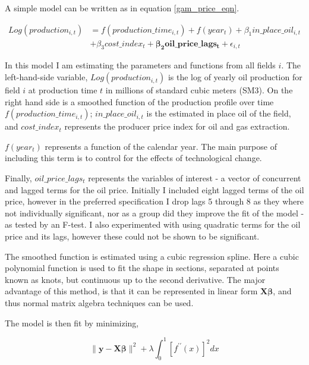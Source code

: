 \documentclass[11pt]{article}
\begin{document}
A simple model can be written as in equation \ref{gam_price_eqn}. 

\begin{equation}
\begin{split}

	Log(production_{i,t}) & = f(production\_time_{i,t}) + f(year_t) + \beta_1 in\_place\_oil_{i,t}\\
	 \quad & + \beta_3 cost\_index_{t} + \mathbf{\beta_2 oil\_price\_lags_t} +  
	  \epsilon_{i,t}
\label{gam_price_eqn}
\end{split}
\end{equation}

In this model I am estimating the parameters and functions from all fields $i$. The left-hand-side variable, $Log(production_{i,t})$ is the log of yearly oil production for field $i$ at production time $t$ in millions of standard cubic meters (SM3).  On the right hand side is a smoothed function of the production profile over time $f(production\_time_{i,t})$; $in\_place\_oil_{i,t}$ is the estimated in place oil of the field, and $cost\_index_{t}$ represents the producer price index for oil and gas extraction. 

$f(year_t)$ represents a function of the calendar year.  The main purpose of including this term is to control for the effects of technological change.

Finally, $oil\_price\_lags_t$ represents the variables of interest - a vector of concurrent and lagged terms for the oil price. Initially I included eight lagged terms of the oil price, however in the preferred specification I drop lags 5 through 8 as they where not individually significant, nor as a group did they improve the fit of the model - as tested by an F-test. I also experimented with using quadratic terms for the oil price and its lags, however these could not be shown to be significant. 

The smoothed function is estimated using a cubic regression spline. Here a cubic polynomial function is used to fit the shape in sections, separated at points known as knots, but continuous up to the second derivative.  The major advantage of this method, is that it can be represented in linear form $\boldsymbol{X \beta} $, and thus normal matrix algebra techniques can be used.  

The model is then fit by minimizing,

\begin{equation}

\| \mathbf{y} - \mathbf{X\beta} \| ^2 + \lambda \int_{0}^{1} [f^{\prime \prime}(x)]^2dx

\end{equation}
\end{document}
